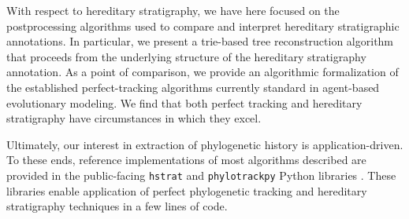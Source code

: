 With respect to hereditary stratigraphy, we have here focused on the postprocessing algorithms used to compare and interpret hereditary stratigraphic annotations.
In particular, we present a trie-based tree reconstruction algorithm that proceeds from the underlying structure of the hereditary stratigraphy annotation.
As a point of comparison, we provide an algorithmic formalization of the established perfect-tracking algorithms currently standard in agent-based evolutionary modeling.
We find that both perfect tracking and hereditary stratigraphy have circumstances in which they excel.


Ultimately, our interest in extraction of phylogenetic history is application-driven.
To these ends, reference implementations of most algorithms described are provided in the public-facing \texttt{hstrat} and \texttt{phylotrackpy} Python libraries \citep{moreno2022hstrat, dolson2024phylotrack}.
These libraries enable application of perfect phylogenetic tracking and hereditary stratigraphy techniques in a few lines of code.
